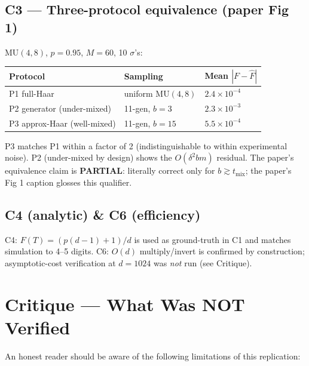 \documentclass[11pt]{article}
\begin{document}
\subsection{C3 --- Three-protocol equivalence (paper Fig 1)}
$\mathrm{MU}(4,8)$, $p=0.95$, $M=60$, 10 $\sigma$'s:
\begin{center}
\small
\begin{tabular}{lll}
\toprule
Protocol & Sampling & Mean $|F-\hat F|$ \\
\midrule
P1 full-Haar & uniform $\mathrm{MU}(4,8)$ & $2.4\times 10^{-4}$ \\
P2 generator (under-mixed) & 11-gen, $b=3$ & $2.3\times 10^{-3}$ \\
P3 approx-Haar (well-mixed) & 11-gen, $b=15$ & $5.5\times 10^{-4}$ \\
\bottomrule
\end{tabular}
\end{center}
P3 matches P1 within a factor of 2 (indistinguishable to within experimental noise). P2 (under-mixed by design) shows the $O(\delta^2 b m)$ residual. The paper's equivalence claim is \textbf{PARTIAL}: literally correct only for $b\gtrsim t_{\text{mix}}$; the paper's Fig 1 caption glosses this qualifier.

\subsection{C4 (analytic) \& C6 (efficiency)}
C4: $F(T) = (p(d-1)+1)/d$ is used as ground-truth in C1 and matches simulation to 4--5 digits. C6: $O(d)$ multiply/invert is confirmed by construction; asymptotic-cost verification at $d=1024$ was \emph{not} run (see Critique).

\section{Critique --- What Was NOT Verified}

An honest reader should be aware of the following limitations of this replication:
\end{document}
